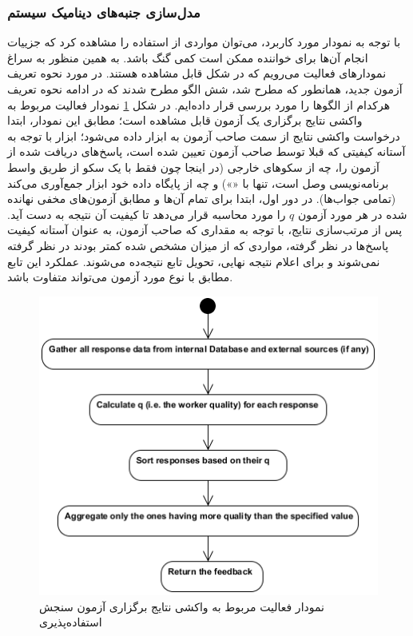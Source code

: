 \subsubsection{مدل‌سازی جنبه‌های دینامیک سیستم}
با توجه به نمودار مورد کاربرد، می‌توان مواردی از استفاده را مشاهده کرد که جزییات انجام آن‌ها برای خواننده ممکن است کمی گنگ باشد. به همین منظور به سراغ نمودارهای فعالیت
می‌رویم که در شکل
قابل مشاهده هستند. در مورد نحوه تعریف آزمون جدید، همانطور که مطرح شد، شش الگو مطرح شدند که در ادامه نحوه تعریف هرکدام از الگوها را مورد بررسی قرار داده‌ایم. در شکل
\ref{fig:aggactivity}
نمودار فعالیت مربوط به واکشی نتایج برگزاری یک آزمون قابل مشاهده است؛ مطابق این نمودار، ابتدا درخواست واکشی نتایج از سمت صاحب آزمون به ابزار داده می‌شود؛ ابزار با توجه به آستانه کیفیتی که قبلا توسط صاحب آزمون تعیین شده است، پاسخ‌های دریافت شده از آزمون را، چه از سکوهای خارجی (در اینجا چون فقط با یک سکو از طریق واسط برنامه‌نویسی وصل است، تنها با
«»)
و چه از پایگاه داده خود ابزار جمع‌آوری می‌کند (تمامی جواب‌ها). در دور اول، ابتدا برای تمام آن‌ها و مطابق آزمون‌های مخفی نهانده شده در هر مورد آزمون
$q$
را مورد محاسبه قرار می‌دهد تا کیفیت آن نتیجه به دست آید. پس از مرتب‌سازی نتایج، با توجه به مقداری که صاحب آزمون، به عنوان آستانه کیفیت پاسخ‌ها در نظر گرفته، مواردی که از میزان مشخص شده کمتر بودند در نظر گرفته نمی‌شوند و برای اعلام نتیجه نهایی، تحویل تابع نتیجه‌ده می‌شوند. عملکرد این تابع مطابق با نوع مورد آزمون می‌تواند متفاوت باشد.
\begin{figure}
	\centering\includegraphics[width=0.7\linewidth]{Resources/AggregationActivityDiagram.PNG}
	\caption{
		نمودار فعالیت مربوط به واکشی نتایج برگزاری آزمون سنجش استفاده‌پذیری
	}
	\label{fig:aggactivity}
\end{figure}
